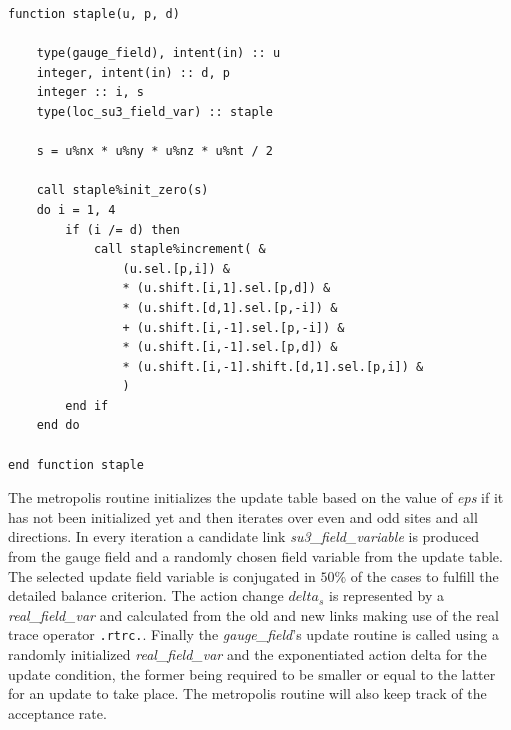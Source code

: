 \documentclass[graybox]{svmult}
\begin{document}
\begin{lstlisting}[caption={Staple function}]
function staple(u, p, d)

    type(gauge_field), intent(in) :: u
    integer, intent(in) :: d, p
	integer :: i, s
	type(loc_su3_field_var) :: staple

	s = u%nx * u%ny * u%nz * u%nt / 2

    call staple%init_zero(s)
    do i = 1, 4
        if (i /= d) then
            call staple%increment( &
                (u.sel.[p,i]) &
                * (u.shift.[i,1].sel.[p,d]) &
                * (u.shift.[d,1].sel.[p,-i]) &
                + (u.shift.[i,-1].sel.[p,-i]) &
                * (u.shift.[i,-1].sel.[p,d]) &
                * (u.shift.[i,-1].shift.[d,1].sel.[p,i]) &
                )
        end if
    end do

end function staple
\end{lstlisting}
The metropolis routine initializes the update table based on the value of \emph{eps} if it has not been initialized yet and then iterates over even and odd sites and all directions. In every iteration a candidate link \emph{su3\_field\_variable} is produced from the gauge field and a randomly chosen field variable from the update table. The selected update field variable is conjugated in $50\%$ of the cases to fulfill the detailed balance criterion. The action change $delta_s$ is represented by a \emph{real\_field\_var} and calculated from the old and new links making use of the real trace operator \lstinline{.rtrc.}{}. Finally the \emph{gauge\_field}'s update routine is called using a randomly initialized \emph{real\_field\_var} and the exponentiated action delta for the update condition, the former being required to be smaller or equal to the latter for an update to take place. The metropolis routine will also keep track of the acceptance rate.
\end{document}

